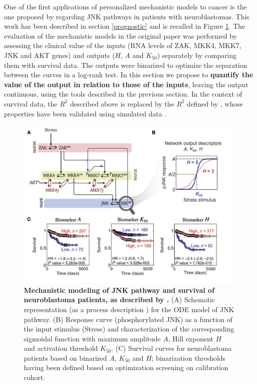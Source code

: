 \documentclass[a4paper,12pt,twoside,onecolumn,openright,final,oldfontcommands]{memoir}
\begin{document}
One of the first applications of personalized mechanistic models to
cancer is the one proposed by \citet{fey2015signaling} regarding JNK
pathways in patients with neuroblastomas. This work has been described
in section \ref{prognostic} and is recalled in Figure \ref{fig:fey2}.
The evaluation of the mechanistic models in the original paper was
performed by assessing the clinical value of the inputs (RNA levels of
ZAK, MKK4, MKK7, JNK and AKT genes) and outputs (\(H\), \(A\) and
\(K_{50}\)) separately by comparing them with survival data. The outputs
were binarized to optimize the separation between the curves in a
log-rank test. In this section we propose to \textbf{quantify the value
of the output in relation to those of the inputs}, leaving the output
continuous, using the tools described in the previous section. In the
context of survival data, the \(R^2\) described above is replaced by the
\(R^2\) defined by \citet{royston2004new}, whose properties have been
validated using simulated data \citep{choodari2012simulation}.

\begin{figure}

{\centering \includegraphics[width=0.9\linewidth]{fig/fey} 

}

\caption[Mechanistic modeling of JNK pathway and survival of neuroblastoma patients, as described by Fey \emph{et al}.]{\textbf{Mechanistic modeling of JNK pathway and
survival of neuroblastoma patients, as described by
\citet{fey2015signaling}.} (A) Schematic representation (as a process
description \citep{le2015quantitative}) for the ODE model of JNK
pathway. (B) Response curve (phosphorylated JNK) as a function of the
input stimulus (Stress) and characterization of the corresponding
sigmoidal function with maximum amplitude \(A\), Hill exponent \(H\) and
activation threshold \(K_{50}\). (C) Survival curves for neuroblastoma
patients based on binarized \(A\), \(K_{50}\) and \(H\); binarization
thresholds having been defined based on optimization screening on
calibration cohort.}\label{fig:fey2}
\end{figure}
\end{document}

